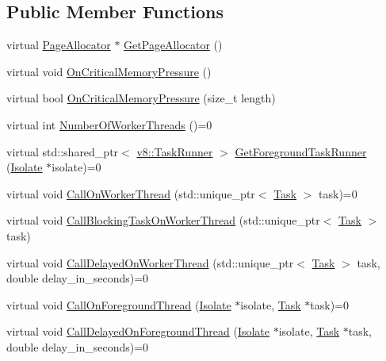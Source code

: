 \subsection*{Public Member Functions}
\begin{DoxyCompactItemize}
\item 
virtual \mbox{\hyperlink{classv8_1_1PageAllocator}{Page\+Allocator}} $\ast$ \mbox{\hyperlink{classv8_1_1Platform_ab7c1886dd8131f7389b805bc98276702}{Get\+Page\+Allocator}} ()
\item 
virtual void \mbox{\hyperlink{classv8_1_1Platform_a7ed41bddc1d1ebe51c55539198d0026e}{On\+Critical\+Memory\+Pressure}} ()
\item 
virtual bool \mbox{\hyperlink{classv8_1_1Platform_a0de4b8a7bb8865ce65beb5afbaabe4cc}{On\+Critical\+Memory\+Pressure}} (size\+\_\+t length)
\item 
virtual int \mbox{\hyperlink{classv8_1_1Platform_a57cdd7eb4c482bfb806c378beeda716d}{Number\+Of\+Worker\+Threads}} ()=0
\item 
virtual std\+::shared\+\_\+ptr$<$ \mbox{\hyperlink{classv8_1_1TaskRunner}{v8\+::\+Task\+Runner}} $>$ \mbox{\hyperlink{classv8_1_1Platform_af0d18c6bbefa133c5d11ec8a460d0278}{Get\+Foreground\+Task\+Runner}} (\mbox{\hyperlink{classv8_1_1Isolate}{Isolate}} $\ast$isolate)=0
\item 
virtual void \mbox{\hyperlink{classv8_1_1Platform_a92dc9c2f54c9a0fea87e15df8d58d699}{Call\+On\+Worker\+Thread}} (std\+::unique\+\_\+ptr$<$ \mbox{\hyperlink{classv8_1_1Task}{Task}} $>$ task)=0
\item 
virtual void \mbox{\hyperlink{classv8_1_1Platform_ada31b440048763bf8d9c296ca4cf2e1b}{Call\+Blocking\+Task\+On\+Worker\+Thread}} (std\+::unique\+\_\+ptr$<$ \mbox{\hyperlink{classv8_1_1Task}{Task}} $>$ task)
\item 
virtual void \mbox{\hyperlink{classv8_1_1Platform_a808b0e55ed3efca10ebca031bbd6ecc6}{Call\+Delayed\+On\+Worker\+Thread}} (std\+::unique\+\_\+ptr$<$ \mbox{\hyperlink{classv8_1_1Task}{Task}} $>$ task, double delay\+\_\+in\+\_\+seconds)=0
\item 
virtual void \mbox{\hyperlink{classv8_1_1Platform_a8fa13959f919d1d3ff170bceea939915}{Call\+On\+Foreground\+Thread}} (\mbox{\hyperlink{classv8_1_1Isolate}{Isolate}} $\ast$isolate, \mbox{\hyperlink{classv8_1_1Task}{Task}} $\ast$task)=0
\item 
virtual void \mbox{\hyperlink{classv8_1_1Platform_a72bff12d95fbf2118279b0e8f53f8a4b}{Call\+Delayed\+On\+Foreground\+Thread}} (\mbox{\hyperlink{classv8_1_1Isolate}{Isolate}} $\ast$isolate, \mbox{\hyperlink{classv8_1_1Task}{Task}} $\ast$task, double delay\+\_\+in\+\_\+seconds)=0

\end{DoxyCompactItemize}
